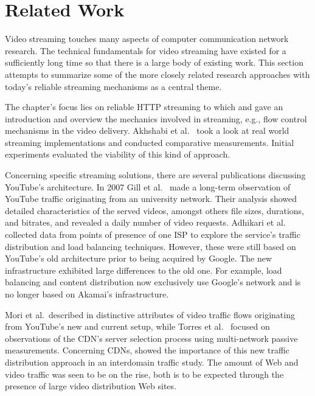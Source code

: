 \section{Related Work}

Video streaming touches many aspects of computer communication network research. The technical fundamentals for video streaming have existed for a sufficiently long time so that there is a large body of existing work. This section attempts to summarize some of the more closely related research approaches with today's reliable streaming mechanisms as a central theme.

The chapter's focus lies on reliable \gls{HTTP} streaming to which \cite{watching-video1,watching-video2} and \cite{ma2011mobile} gave an introduction and overview the mechanics involved in streaming, e.g., flow control mechanisms in the video delivery. Akhshabi et al.~\cite{akhshabi2011experimental} took a look at real world streaming implementations and conducted comparative measurements. Initial experiments evaluated the viability of this kind of approach. 

Concerning specific streaming solutions, there are several publications discussing YouTube's architecture. In 2007 Gill et al.~\cite{gill2007youtube} made a long-term observation of YouTube traffic originating from an university network. Their analysis showed detailed characteristics of the served videos, amongst others file sizes, durations, and bitrates, and revealed a daily number of video requests. Adhikari et al.~\cite{adhikari2010youtube} collected data from points of presence of one \gls{ISP} to explore the service's traffic distribution and load balancing techniques. However, these were still based on YouTube's old architecture prior to being acquired by Google. The new infrastructure exhibited large differences to the old one. For example, load balancing and content distribution now exclusively use Google's network and is no longer based on Akamai's infrastructure. 

Mori et al.\ described in \cite{mori2010characterizing} distinctive attributes of video traffic flows originating from YouTube's new and current setup, while Torres et al.~\cite{torres2011dissecting} focused on observations of the \gls{CDN}'s server selection process using multi-network passive measurements. Concerning \glspl{CDN}, \cite{Labovitz:2010:IIT:2043164.1851194} showed the importance of this new traffic distribution approach in an interdomain traffic study. The amount of Web and video traffic was seen to be on the rise, both is to be expected through the presence of large video distribution Web sites.


